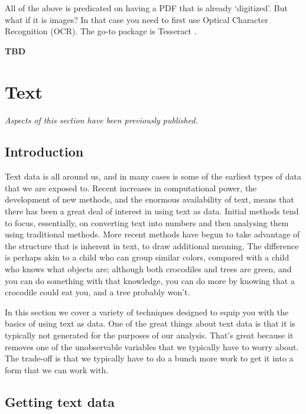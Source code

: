 \documentclass[
]{book}
\begin{document}
All of the above is predicated on having a PDF that is already `digitized'. But what if it is images? In that case you need to first use Optical Character Recognition (OCR). The go-to package is Tesseract \citet{citetesseract}.

\textbf{TBD}

\hypertarget{text}{%
\section{Text}\label{text}}

\emph{Aspects of this section have been previously published.}

\hypertarget{introduction-13}{%
\subsection{Introduction}\label{introduction-13}}

Text data is all around us, and in many cases is some of the earliest types of data that we are exposed to. Recent increases in computational power, the development of new methods, and the enormous availability of text, means that there has been a great deal of interest in using text as data. Initial methods tend to focus, essentially, on converting text into numbers and then analysing them using traditional methods. More recent methods have begun to take advantage of the structure that is inherent in text, to draw additional meaning. The difference is perhaps akin to a child who can group similar colors, compared with a child who knows what objects are; although both crocodiles and trees are green, and you can do something with that knowledge, you can do more by knowing that a crocodile could eat you, and a tree probably won't.

In this section we cover a variety of techniques designed to equip you with the basics of using text as data. One of the great things about text data is that it is typically not generated for the purposes of our analysis. That's great because it removes one of the unobservable variables that we typically have to worry about. The trade-off is that we typically have to do a bunch more work to get it into a form that we can work with.

\hypertarget{getting-text-data}{%
\subsection{Getting text data}\label{getting-text-data}}
\end{document}
